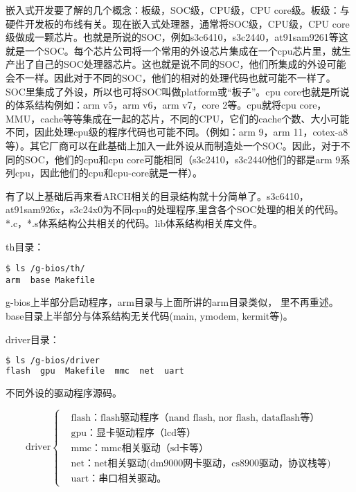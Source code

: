 嵌入式开发要了解的几个概念：板级，SOC级，CPU级，CPU core级。板级：与硬件开发板的布线有关。现在嵌入式处理器，通常将SOC级，CPU级，CPU core级做成一颗芯片。也就是所说的SOC，例如s3c6410，s3c2440，at91sam9261等这就是一个SOC。每个芯片公司将一个常用的外设芯片集成在一个cpu芯片里，就生产出了自己的SOC处理器芯片。这也就是说不同的SOC，他们所集成的外设可能会不一样。因此对于不同的SOC，他们的相对的处理代码也就可能不一样了。SOC里集成了外设，所以也可将SOC叫做platform或``板子''。cpu core也就是所说的体系结构例如：arm v5，arm v6，arm v7，core 2等。cpu就将cpu core，MMU，cache等等集成在一起的芯片，不同的CPU，它们的cache个数、大小可能不同，因此处理cpu级的程序代码也可能不同。（例如：arm 9，arm 11，cotex-a8等）。其它厂商可以在此基础上加入一此外设从而制造处一个SOC。因此，对于不同的SOC，他们的cpu和cpu core可能相同（s3c2410，s3c2440他们的都是arm 9系列cpu，因此他们的cpu和cpu-core就是一样）。

有了以上基础后再来看ARCH相关的目录结构就十分简单了。s3c6410，at91sam926x，s3c24x0为不同cpu的处理程序,里含各个SOC处理的相关的代码。*.c，*.s体系结构公共相关的代码。lib体系结构相关库文件。

th目录：
\begin{lstlisting}[language={SH}]
$ ls /g-bios/th/
arm  base Makefile
\end{lstlisting}
g-bios上半部分启动程序，arm目录与上面所讲的arm目录类似， 里不再重述。
base目录上半部分与体系结构无关代码(main, ymodem, kermit等)。

driver目录：
\begin{lstlisting}[language=bash, numbers=none]
$ ls /g-bios/driver
flash  gpu  Makefile  mmc  net  uart
\end{lstlisting}
不同外设的驱动程序源码。

\begin{equation*}
\text{driver}
\left\{
	\begin{aligned}
	&\text{flash：flash驱动程序（nand flash, nor flash, dataflash等）}\\
	&\text{gpu：显卡驱动程序（lcd等）}\\
	&\text{mmc：mmc相关驱动（sd卡等）}\\
	&\text{net：net相关驱动(dm9000网卡驱动，cs8900驱动，协议栈等)}\\
	&\text{uart：串口相关驱动。}
	\end{aligned}
\right.
\end{equation*}
